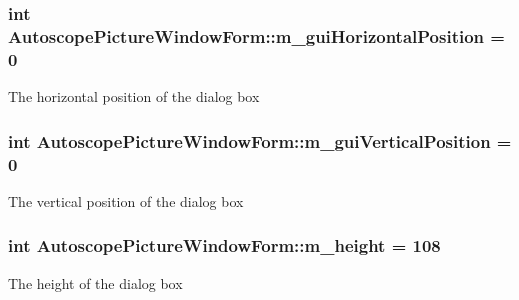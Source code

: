 \subsubsection[{\texorpdfstring{m\+\_\+gui\+Horizontal\+Position}{m_guiHorizontalPosition}}]{\setlength{\rightskip}{0pt plus 5cm}int Autoscope\+Picture\+Window\+Form\+::m\+\_\+gui\+Horizontal\+Position = 0\hspace{0.3cm}{\ttfamily [private]}}\hypertarget{class_autoscope_picture_window_form_ab85a9e8a721d8b8f9d50c03d7dd91eaf}{}\label{class_autoscope_picture_window_form_ab85a9e8a721d8b8f9d50c03d7dd91eaf}
The horizontal position of the dialog box 
\subsubsection[{\texorpdfstring{m\+\_\+gui\+Vertical\+Position}{m_guiVerticalPosition}}]{\setlength{\rightskip}{0pt plus 5cm}int Autoscope\+Picture\+Window\+Form\+::m\+\_\+gui\+Vertical\+Position = 0\hspace{0.3cm}{\ttfamily [private]}}\hypertarget{class_autoscope_picture_window_form_acc65dba5ea960c1c8e38267b913a67d3}{}\label{class_autoscope_picture_window_form_acc65dba5ea960c1c8e38267b913a67d3}
The vertical position of the dialog box 
\subsubsection[{\texorpdfstring{m\+\_\+height}{m_height}}]{\setlength{\rightskip}{0pt plus 5cm}int Autoscope\+Picture\+Window\+Form\+::m\+\_\+height = 108\hspace{0.3cm}{\ttfamily [private]}}\hypertarget{class_autoscope_picture_window_form_aba2d2633eaffee2cff0babc6db1ab1e4}{}\label{class_autoscope_picture_window_form_aba2d2633eaffee2cff0babc6db1ab1e4}
The height of the dialog box 
